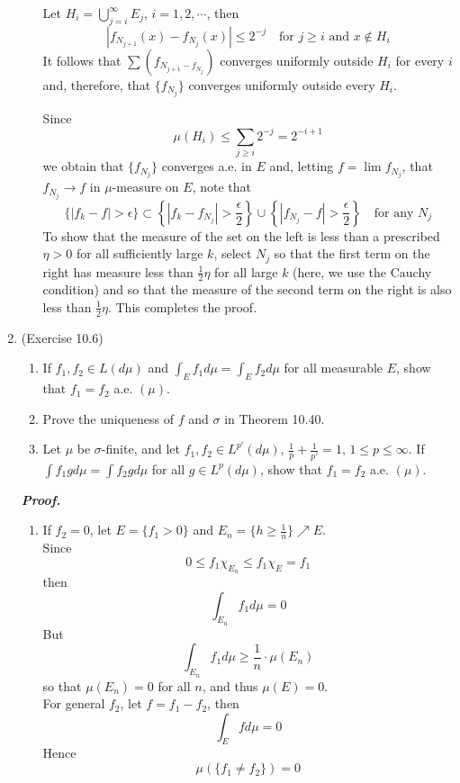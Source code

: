 \documentclass[a4paper,11pt]{article}
\begin{document}
\begin{enumerate}
\begin{enumerate}
			Let $H_i = \bigcup_{j=i}^\infty E_j$, $i = 1,2,\cdots$, then
				$$|f_{N_{j+1}}(x) - f_{N_j}(x)| \leq 2^{-j} \quad \text{for $j \geq i$ and $x \notin H_i$} $$
			It follows that $\sum(f_{N_{j+1} - f_{N_j}})$ converges uniformly outside $H_i$ for every $i$ and, therefore, that $\{f_{N_j}\}$ converges uniformly outside every $H_i$.\

			Since
				$$\mu(H_i) \leq \sum_{j \geq i} 2^{-j} = 2^{-i+1}$$
			we obtain that $\{f_{N_j}\}$ converges a.e. in $E$ and, letting $f = \lim f_{N_j}$, that $f_{N_j} \to f$ in $\mu$-measure on $E$, note that
				$$\{|f_k - f| > \epsilon\}
				\subset
				\left\{ |f_k - f_{N_j}| > \frac{\epsilon}{2} \right\} \cup \left\{ |f_{N_j} - f| > \frac{\epsilon}{2} \right\}
				\quad \text{for any } N_j$$
			To show that the measure of the set on the left is less than a prescribed $\eta > 0$ for all sufficiently large $k$, select $N_j$ so that the first term on the right has measure less than $\frac{1}{2} \eta$ for all large $k$ (here, we use the Cauchy condition) and so that the measure of the second term on the right is also less than $\frac{1}{2} \eta$. This completes the proof.\\


	\end{enumerate}


	\item (Exercise 10.6)
		\begin{enumerate}
			\item If $f_1, f_2 \in L(d \mu)$ and $\int_E f_1 d \mu = \int_E f_2 d \mu$ for all measurable $E$, show that $f_1 = f_2$ a.e. $(\mu)$.

			\item  Prove the uniqueness of $f$ and $\sigma$ in Theorem 10.40.

			\item Let $\mu$ be $\sigma$-finite, and let $f_1, f_2 \in L^{p'} (d\mu)$, $\frac{1}{p} + \frac{1}{p'} = 1$, $1 \leq p \leq \infty$. If $\int f_1 g d\mu = \int f_2 g d \mu$ for all $g \in L^p(d\mu)$, show that $f_1 = f_2$ a.e. $(\mu)$.\
		\end{enumerate}

	\textit{\textbf {Proof.}}\\
		\begin{enumerate}
			\item If $f_2 = 0$, let $E = \{ f_1 > 0 \}$ and $E_n = \{ h \geq \frac{1}{n} \} \nearrow E$.\\
			Since 
				$$0 \leq f_1 \chi_{E_n} \leq f_1 \chi_E = f_1$$
			then
				$$\int_{E_n} f_1 d \mu = 0$$
			But
				$$\int_{E_n} f_1 d\mu \geq \frac{1}{n} \cdot \mu(E_n)$$
			so that $\mu (E_n) = 0$ for all $n$, and thus $\mu (E) = 0$.\\
			For general $f_2$, let $f = f_1 - f_2$, then
				$$\int_E f d\mu = 0$$
			Hence
				$$\mu(\{f_1 \neq f_2\}) = 0$$


\end{enumerate}
\end{enumerate}
\end{document}

